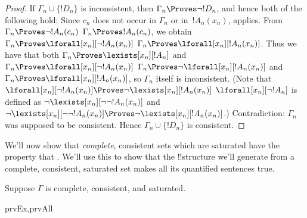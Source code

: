 \documentclass[../../../include/open-logic-section]{subfiles}
\begin{document}
\begin{proof}
If $\Gamma_n \cup \{!D_n\}$ is inconsistent, then $\Gamma_n
\Proves \lnot !D_n$, and hence both of the following hold:
Since $c_n$ does not occur in
$\Gamma_n$ or in~$!A_n(x_n)$, 
 applies.
From 
{$\Gamma_n \Proves \lnot !A_n(c_n)$}
{$\Gamma_n \Proves !A_n(c_n)$},
we obtain
{$\Gamma_n \Proves \lforall[x_n][\lnot !A_n(x_n)]$}
{$\Gamma_n \Proves \lforall[x_n][!A_n(x_n)]$}.
Thus we have that both
{$\Gamma_n \Proves \lexists[x_n][!A_n]$ and
$\Gamma_n \Proves \lforall[x_n][\lnot !A_n(x_n)]$}
{$\Gamma_n \Proves \lnot\lforall[x_n][!A_n(x_n)]$ and
$\Gamma_n \Proves \lforall[x_n][!A_n(x_n)]$},
so $\Gamma_n$ itself is inconsistent.
{(Note that
{$\lforall[x_n][\lnot !A_n(x_n)] \Proves
  \lnot\lexists[x_n][!A_n(x_n)]$}
{$\lforall[x_n][\lnot !A_n]$ is defined as
  $\lnot\lexists[x_n][\lnot\lnot !A_n(x_n)]$ and
  $\lnot\lexists[x_n][\lnot\lnot !A_n(x_n)] \Proves
  \lnot\lexists[x_n][!A_n(x_n)]$}.)}{}
Contradiction: $\Gamma_n$ was supposed to be consistent.  Hence
$\Gamma_n \cup \{ !D_n\}$ is consistent.
\end{proof}

\begin{explain}
We'll now show that \emph{complete}, consistent sets which are
saturated have the property that . We'll use this to show that the !!{structure} we'll
generate from a complete, consistent, saturated set makes all its
quantified sentences true.
\end{explain}

\begin{prop}
Suppose $\Gamma$ is complete, consistent, and saturated.
\begin{tagenumerate}{prvEx,prvAll}
\end{tagenumerate}
\end{prop}
\end{document}
